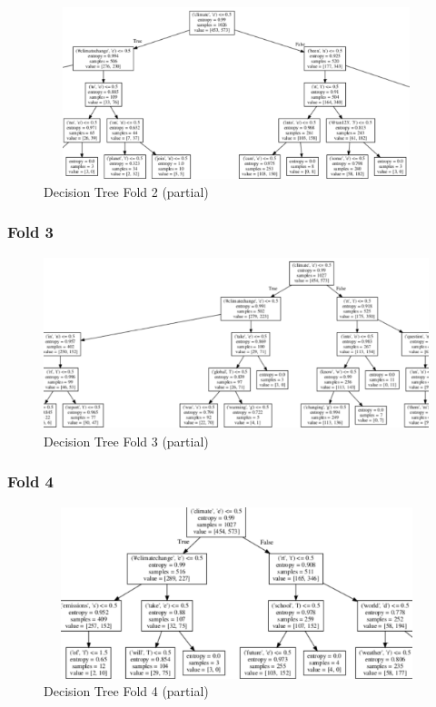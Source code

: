 \documentclass{article} %
\begin{document}
\begin{figure}[H]
	\includegraphics[height=5cm, width=17cm]{7.png}
	\caption{Decision Tree Fold 2 (partial)}
\end{figure}

\subsubsection{Fold 3}

\begin{figure}[H]
	\includegraphics[height=5cm, width=17cm]{8.png}
	\caption{Decision Tree Fold 3 (partial)}
\end{figure}

\subsubsection{Fold 4}

\begin{figure}[H]
	\includegraphics[height=5cm, width=17cm]{9.png}
	\caption{Decision Tree Fold 4 (partial)}
\end{figure}
\end{document}
